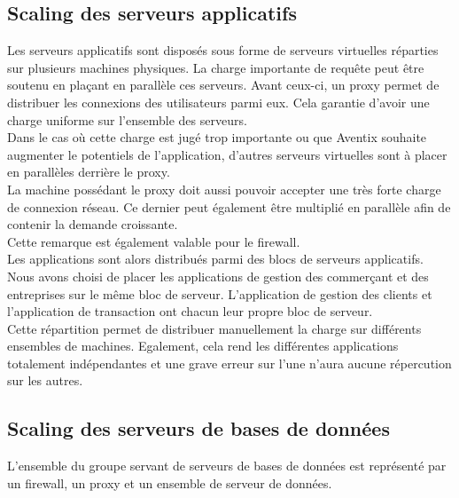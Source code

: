\subsection{Scaling des serveurs applicatifs}
\label{subsec:scaling-applicatif}

Les serveurs applicatifs sont disposés sous forme de serveurs virtuelles
réparties sur plusieurs machines physiques. La charge importante de requête
peut être soutenu en plaçant en parallèle ces serveurs. Avant ceux-ci, un proxy
permet de distribuer les connexions des utilisateurs parmi eux. Cela garantie
d'avoir une charge uniforme sur l'ensemble des serveurs. \\

Dans le cas où cette charge est jugé trop importante ou que Aventix souhaite
augmenter le potentiels de l'application, d'autres serveurs virtuelles sont à
placer en parallèles derrière le proxy. \\

La machine possédant le proxy doit aussi pouvoir accepter une très forte charge
de connexion réseau. Ce dernier peut également être multiplié en parallèle afin
de contenir la demande croissante. \\

Cette remarque est également valable pour le firewall. \\

Les applications sont alors distribués parmi des blocs de serveurs applicatifs.
Nous avons choisi de placer les applications de gestion des commerçant et des
entreprises sur le même bloc de serveur. L'application de gestion des clients
et l'application de transaction ont chacun leur propre bloc de serveur. \\

Cette répartition permet de distribuer manuellement la charge sur différents
ensembles de machines. Egalement, cela rend les différentes applications
totalement indépendantes et une grave erreur sur l'une n'aura aucune
répercution sur les autres. \\

\subsection{Scaling des serveurs de bases de données}
\label{subsec:scaling-bdd}

L'ensemble du groupe servant de serveurs de bases de données est représenté par
un firewall, un proxy et un ensemble de serveur de données. \\

